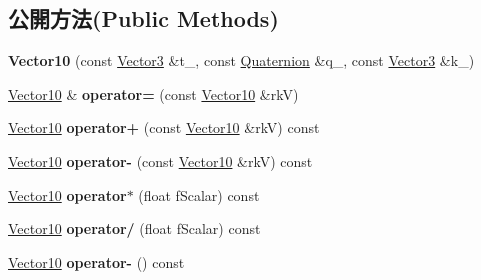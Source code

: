 \subsection*{公開方法(Public Methods)}
\begin{DoxyCompactItemize}
\item 
{\bfseries Vector10} (const \hyperlink{class_magnum_1_1_vector3}{Vector3} \&t\+\_\+, const \hyperlink{class_magnum_1_1_quaternion}{Quaternion} \&q\+\_\+, const \hyperlink{class_magnum_1_1_vector3}{Vector3} \&k\+\_\+)\hypertarget{class_magnum_1_1_vector10_ac95d26a1a398b5ecfd646a41b39893dc}{}\label{class_magnum_1_1_vector10_ac95d26a1a398b5ecfd646a41b39893dc}

\item 
\hyperlink{class_magnum_1_1_vector10}{Vector10} \& {\bfseries operator=} (const \hyperlink{class_magnum_1_1_vector10}{Vector10} \&rkV)\hypertarget{class_magnum_1_1_vector10_af006b5d5f0559cd7199647600eaa1e76}{}\label{class_magnum_1_1_vector10_af006b5d5f0559cd7199647600eaa1e76}

\item 
\hyperlink{class_magnum_1_1_vector10}{Vector10} {\bfseries operator+} (const \hyperlink{class_magnum_1_1_vector10}{Vector10} \&rkV) const \hypertarget{class_magnum_1_1_vector10_a449127793f71643d03fde0bf5a06f1f2}{}\label{class_magnum_1_1_vector10_a449127793f71643d03fde0bf5a06f1f2}

\item 
\hyperlink{class_magnum_1_1_vector10}{Vector10} {\bfseries operator-\/} (const \hyperlink{class_magnum_1_1_vector10}{Vector10} \&rkV) const \hypertarget{class_magnum_1_1_vector10_af1dce227feb50bc97067f0697cd71e0b}{}\label{class_magnum_1_1_vector10_af1dce227feb50bc97067f0697cd71e0b}

\item 
\hyperlink{class_magnum_1_1_vector10}{Vector10} {\bfseries operator$\ast$} (float f\+Scalar) const \hypertarget{class_magnum_1_1_vector10_a2fea9658340acd882d82536b8711b08f}{}\label{class_magnum_1_1_vector10_a2fea9658340acd882d82536b8711b08f}

\item 
\hyperlink{class_magnum_1_1_vector10}{Vector10} {\bfseries operator/} (float f\+Scalar) const \hypertarget{class_magnum_1_1_vector10_aabe6dc4e835aa76eced770e3b82f0f0a}{}\label{class_magnum_1_1_vector10_aabe6dc4e835aa76eced770e3b82f0f0a}

\item 
\hyperlink{class_magnum_1_1_vector10}{Vector10} {\bfseries operator-\/} () const \hypertarget{class_magnum_1_1_vector10_af8b311cbcfe9646794131beb1df6dc20}{}\label{class_magnum_1_1_vector10_af8b311cbcfe9646794131beb1df6dc20}


\end{DoxyCompactItemize}

